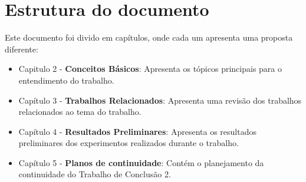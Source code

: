 \section{Estrutura do documento}
Este documento foi divido em capítulos, onde cada um apresenta uma proposta diferente:
\begin{itemize}
	\item Capitulo 2 - \textbf{Conceitos Básicos}: Apresenta os tópicos principais para o entendimento
		do trabalho.
	\item Capítulo 3 - \textbf{Trabalhos Relacionados}: Apresenta uma revisão dos trabalhos
		relacionados ao tema do trabalho.
	\item Capítulo 4 - \textbf{Resultados Preliminares}: Apresenta os resultados preliminares dos
		experimentos realizados durante o trabalho.
	\item Capítulo 5 - \textbf{Planos de continuidade}: Contém o planejamento da continuidade do
		Trabalho de Conclusão 2.
\end{itemize}
